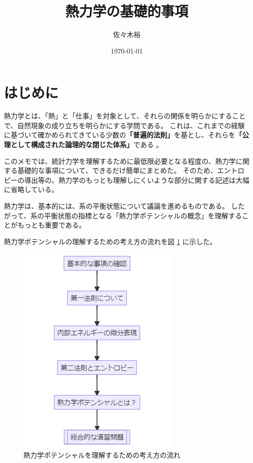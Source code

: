 \documentclass[uplatex,dvipdfmx,a4paper,11pt]{jsarticle}
\title{熱力学の基礎的事項}
\author{佐々木裕}
\date{\today}
\begin{document}
\maketitle


\tableofcontents
\newpage

\setcounter{secnumdepth}{4}


\section*{はじめに}

熱力学とは、「熱」と「仕事」を対象として、それらの関係を明らかにすることで、自然現象の成り立ちを明らかにする学問である。
これは、これまでの経験に基づいて確かめられてきている少数の{\bf「普遍的法則」}を基とし、それらを{\bf「公理として構成された論理的な閉じた体系」}である 。

このメモでは、統計力学を理解するために最低限必要となる程度の、熱力学に関する基礎的な事項について、できるだけ簡単にまとめた。
そのため、エントロピーの導出等の、熱力学のもっとも理解しにくいような部分に関する記述は大幅に省略している。

熱力学は、基本的には、系の平衡状態について議論を進めるものである。
したがって、系の平衡状態の指標となる「熱力学ポテンシャルの概念」を理解することがもっとも重要である。

熱力学ポテンシャルの理解するための考え方の流れを図 \ref{fig:flow} に示した。

\begin{figure}[htbp]
\centering
	\includegraphics[width=.7\textwidth]{flow.png}
\caption{熱力学ポテンシャルを理解するための考え方の流れ}\label{fig:flow}
\end{figure}
\end{document}
